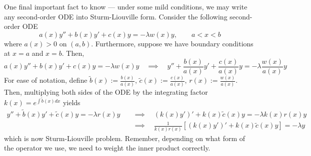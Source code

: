 One final important fact to know --- under some mild conditions, we may write any second-order ODE into Sturm-Liouville form. Consider the following second-order ODE
$$a(x) y'' + b(x) y' + c(x) y = -\lambda w(x) y, \quad \quad a < x < b $$
where $a(x) > 0$ on $(a,b)$. Furthermore, suppose we have boundary conditions at $x=a$ and $x=b$. Then,
$$a(x) y'' + b(x) y' + c(x) y = -\lambda w(x) y  \quad \implies \quad y'' + \frac{b(x)}{a(x)} y' + \frac{c(x)}{a(x)}y = -\lambda \frac{w(x)}{a(x)} y $$
For ease of notation, define $\tilde{b}(x) := \frac{b(x)}{a(x)}$, $\tilde{c}(x) := \frac{c(x)}{a(x)}$, $r(x) := \frac{w(x)}{a(x)}$. Then, multiplying both sides of the ODE by the integrating factor $k(x) = e^{\int \tilde{b}(x) dx}$ yields
\begin{align*}
	 y'' +\tilde{b}(x) y' + \tilde{c}(x) y = -\lambda r(x) y \quad &\implies \quad \left( k(x) y' \right)' + k(x) \tilde{c}(x) y = -\lambda k(x) r(x) y \\
	 &\implies \quad \frac{1}{k(x)r(x)} \left[ \left( k(x) y' \right)' + k(x) \tilde{c}(x) y \right] = -\lambda y
\end{align*}
which is now Sturm-Liouville problem. Remember, depending on what form of the operator we use, we need to weight the inner product correctly.
